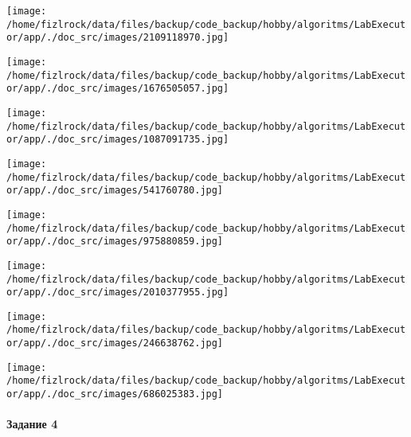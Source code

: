 \documentclass[a4paper, 12pt]{article}
\begin{document}
\texttt{[image: /home/fizlrock/data/files/backup/code\_backup/hobby/algoritms/LabExecutor/app/./doc\_src/images/2109118970.jpg]}

\texttt{[image: /home/fizlrock/data/files/backup/code\_backup/hobby/algoritms/LabExecutor/app/./doc\_src/images/1676505057.jpg]}

\texttt{[image: /home/fizlrock/data/files/backup/code\_backup/hobby/algoritms/LabExecutor/app/./doc\_src/images/1087091735.jpg]}

\texttt{[image: /home/fizlrock/data/files/backup/code\_backup/hobby/algoritms/LabExecutor/app/./doc\_src/images/541760780.jpg]}

\texttt{[image: /home/fizlrock/data/files/backup/code\_backup/hobby/algoritms/LabExecutor/app/./doc\_src/images/975880859.jpg]}

\texttt{[image: /home/fizlrock/data/files/backup/code\_backup/hobby/algoritms/LabExecutor/app/./doc\_src/images/2010377955.jpg]}

\texttt{[image: /home/fizlrock/data/files/backup/code\_backup/hobby/algoritms/LabExecutor/app/./doc\_src/images/246638762.jpg]}

\texttt{[image: /home/fizlrock/data/files/backup/code\_backup/hobby/algoritms/LabExecutor/app/./doc\_src/images/686025383.jpg]}
\pagebreak
\paragraph{Задание 4}
\end{document}
